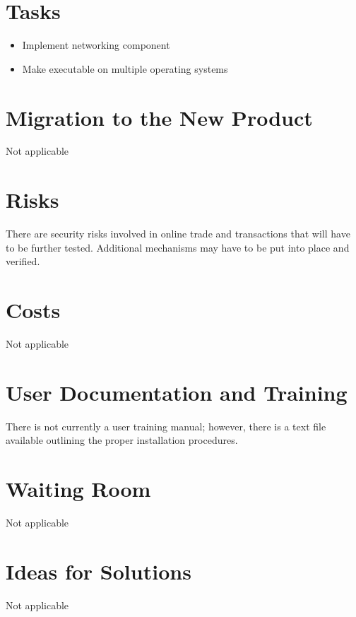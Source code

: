 \documentclass{article}
\begin{document}
\section{Tasks}
\begin{itemize}
	\item
	Implement networking component
	\item
	Make executable on multiple operating systems
\end{itemize}

\section{Migration to the New Product}
Not applicable
\section{Risks}
There are security risks involved in online trade and transactions that will have to be further tested. Additional mechanisms may have to be put into place and verified.
\section{Costs}
Not applicable
\section{User Documentation and Training}
There is not currently a user training manual; however, there is a text file available outlining the proper installation procedures.
\section{Waiting Room}
Not applicable
\section{Ideas for Solutions}
Not applicable


\listoffigures


\listoftables
\end{document}
